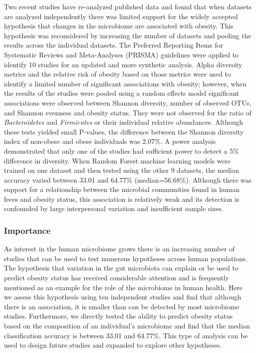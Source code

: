 \documentclass[12pt,]{article}
\begin{document}
Two recent studies have re-analyzed published data and found that when
datasets are analyzed independently there was limited support for the
widely accepted hypothesis that changes in the microbiome are associated
with obesity. This hypothesis was reconsidered by increasing the number
of datasets and pooling the results across the individual datasets. The
Preferred Reporting Items for Systematic Reviews and Meta-Analyses
(PRISMA) guidelines were applied to identify 10 studies for an updated
and more synthetic analysis. Alpha diversity metrics and the relative
risk of obesity based on those metrics were used to identify a limited
number of significant associations with obesity; however, when the
results of the studies were pooled using a random effects model
significant associations were observed between Shannon diversity, number
of observed OTUs, and Shannon evenness and obesity status. They were not
observed for the ratio of \emph{Bacteroidetes} and \emph{Firmicutes} or
their individual relative abundances. Although these tests yielded small
P-values, the difference between the Shannon diversity index of
non-obese and obese individuals was 2.07\%. A power analysis
demonstrated that only one of the studies had sufficient power to detect
a 5\% difference in diversity. When Random Forest machine learning
models were trained on one dataset and then tested using the other 9
datasets, the median accuracy varied between 33.01 and 64.77\%
(median=56.68\%). Although there was support for a relationship between
the microbial communities found in human feces and obesity status, this
association is relatively weak and its detection is confounded by large
interpersonal variation and insufficient sample sizes.

\subsubsection{Importance}\label{importance}

As interest in the human microbiome grows there is an increasing number
of studies that can be used to test numerous hypotheses across human
populations. The hypothesis that variation in the gut microbiota can
explain or be used to predict obesity status has received considerable
attention and is frequently mentioned as an example for the role of the
microbiome in human health. Here we assess this hypothesis using ten
independent studies and find that although there is an association, it
is smaller than can be detected by most microbiome studies. Furthermore,
we directly tested the ability to predict obesity status based on the
composition of an individual's microbiome and find that the median
classification accuracy is between 33.01 and 64.77\%. This type of
analysis can be used to design future studies and expanded to explore
other hypotheses.
\end{document}
